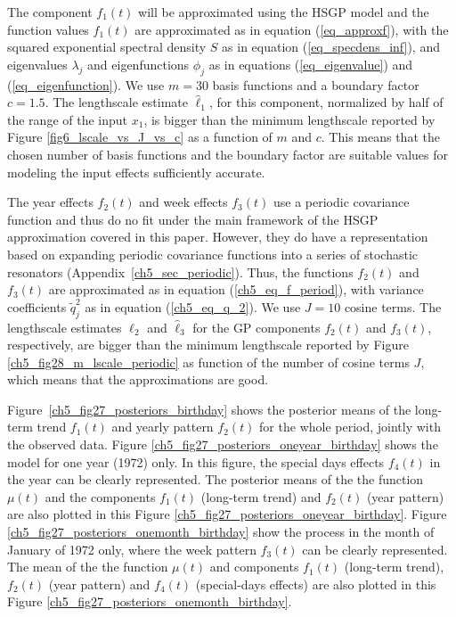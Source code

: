 \documentclass[onecolumn,a4paper,11pt]{article}
\begin{document}
The component $f_1(t)$ will be approximated using the HSGP model and the function values $f_1(t)$ are approximated as in equation (\ref{eq_approxf}), with the squared exponential spectral density $S$ as in equation (\ref{eq_specdens_inf}), and eigenvalues $\lambda_j$ and eigenfunctions $\phi_j$ as in equations (\ref{eq_eigenvalue}) and (\ref{eq_eigenfunction}). We use $m=30$ basis functions and a boundary factor $c=1.5$. The lengthscale estimate $\hat{\ell}_1$, for this component, normalized by half of the range of the input $x_1$, is bigger than the minimum lengthscale reported by Figure \ref{fig6_lscale_vs_J_vs_c} as a function of $m$ and $c$. This means that the chosen number of basis functions and the boundary factor are suitable values for modeling the input effects sufficiently accurate. 

The year effects $f_2(t)$ and week effects $f_3(t)$ use a periodic covariance function  and thus do no fit under the main framework of the HSGP approximation covered in this paper. However, they do have a representation based on expanding periodic covariance functions into a series of stochastic resonators (Appendix~\ref{ch5_sec_periodic}). Thus, the functions $f_2(t)$ and $f_3(t)$ are approximated as in equation (\ref{ch5_eq_f_period}), with variance coefficients $\tilde{q}_j^2$ as in equation (\ref{ch5_eq_q_2}).
We use $J=10$ cosine terms. The lengthscale estimates $\hat{\ell}_2$ and $\hat{\ell}_3$ for the GP components $f_2(t)$ and $f_3(t)$, respectively, are bigger than the minimum lengthscale reported by Figure \ref{ch5_fig28_m_lscale_periodic} as function of the number of cosine terms $J$, which means that the approximations are good.

Figure~\ref{ch5_fig27_posteriors_birthday} shows the posterior means of the long-term trend $f_1(t)$ and yearly pattern $f_2(t)$ for the whole period, jointly with the observed data. Figure \ref{ch5_fig27_posteriors_oneyear_birthday} shows the model for one year (1972) only. In this figure, the special days effects $f_4(t)$ in the year can be clearly represented. The posterior means of the the function $\mu(t)$ and the components $f_1(t)$ (long-term trend) and $f_2(t)$ (year pattern) are also plotted in this Figure \ref{ch5_fig27_posteriors_oneyear_birthday}. Figure \ref{ch5_fig27_posteriors_onemonth_birthday} show the process in the month of January of 1972 only, where the week pattern $f_3(t)$ can be clearly represented. The mean of the the function $\mu(t)$ and components $f_1(t)$ (long-term trend), $f_2(t)$ (year pattern) and $f_4(t)$ (special-days effects) are also plotted in this Figure \ref{ch5_fig27_posteriors_onemonth_birthday}. 
\end{document}
